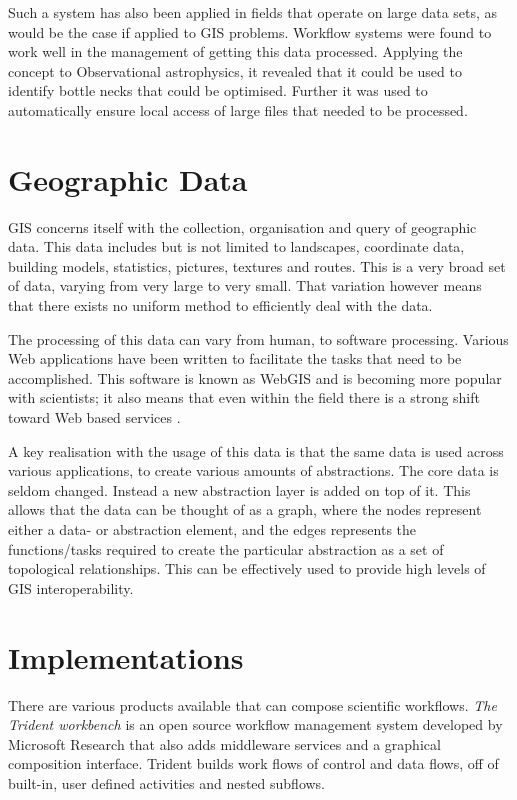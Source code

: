 \documentclass[11pt,twocolumn]{article}
\begin{document}
    Such a system has also been applied in fields that
    operate on large data sets, as would be the case if
    applied to GIS problems. Workflow systems were found
    to work well in the management of getting this data
    processed. Applying the concept to Observational
    astrophysics, it revealed that it could be used
    to identify bottle necks that could be optimised.
    Further it was used to automatically ensure local
    access of large files that needed to be processed.
    \cite{Aragon:2009:WMH:1529282.1529491}

\section{Geographic Data}
    GIS concerns itself with the collection, organisation
    and query of geographic data. \cite{DiMartino:2007:TAG:1341012.1341081}
    This data includes but  is not limited to landscapes,
    coordinate data, building models,
    statistics, pictures, textures and routes. This
    is a very broad set of data, varying from very large to very small.
    That variation however means that there exists no uniform method
    to efficiently deal with the data.

    The processing of this data can vary from human, to software
    processing. Various Web applications have been written
    to facilitate the tasks that need to be accomplished.
    This software is known as WebGIS and is becoming more
    popular with scientists; it also means that even within
    the field there is a strong shift toward Web based services
    \cite{DiMartino:2007:TAG:1341012.1341081}.

    A key realisation with the usage of this data is that
    the same data is used across various applications,
    to create various amounts of  abstractions.
    The core data is seldom changed. Instead a new abstraction
    layer is added on top of it. This allows that the data
    can be thought of as a graph, where the nodes represent
    either a data- or abstraction element, and the edges
    represents the functions/tasks required to create the
    particular abstraction as a set of topological
    relationships. This can be effectively used to provide
    high levels of GIS
    interoperability\cite{ElAdnani:2001:MLF:512161.512177}.

\section{Implementations}
    There are various products available that can compose
    scientific workflows. \emph{The Trident workbench}
    \cite{Simmhan:2009:BTS:1673063.1673121} is an open
    source workflow management system developed by Microsoft
    Research that also adds middleware services and a graphical
    composition interface. Trident builds work flows of control
    and data flows, off of built-in, user defined activities and
    nested subflows.
\end{document}
